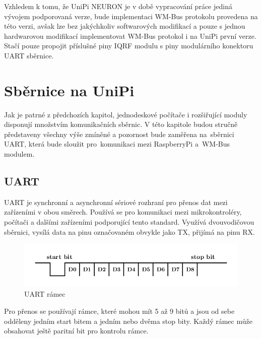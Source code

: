 \vspace{10pt}
Vzhledem k tomu, že UniPi NEURON je v době vypracování práce jediná vývojem podporovaná verze, bude implementaci WM-Bus protokolu provedena na této verzi, avšak lze bez jakýchkoliv softwarových modifikací a pouze s jednou hardwarovou modifikací implementovat WM-Bus protokol i na UniPi první verze. Stačí pouze propojit příslušné piny IQRF modulu s piny modulárního konektoru UART sběrnice.



\section{Sběrnice na UniPi}
Jak je patrné z předchozích kapitol, jednodeskové počítače i rozšiřující moduly disponují množstvím komunikačních sběrnic. V této kapitole budou stručně představeny všechny výše zmíněné a pozornost bude zaměřena na~sběrnici UART, která bude sloužit pro~komunikaci mezi RaspberryPi a~WM-Bus modulem.

\subsection{UART}
UART je synchronní a asynchronní sériové rozhraní pro přenos dat mezi zařízeními v obou směrech. Používá se pro komunikaci mezi mikrokontroléry, počítači a dalšími zařízeními podporující tento standard. Využívá dvouvodičovou sběrnici, vysílá data na pinu označovaném obvykle jako TX, přijímá na pinu RX.

 \begin{figure}[!ht]
	\vspace{-10pt}
  \begin{center}
    \includegraphics[scale=1.0]{obrazky/sbernice_uart}
  \end{center}
	\vspace{-30pt}
  \caption{UART rámec}
	\vspace{-5pt}
\end{figure}
Pro přenos se používají rámce, které mohou mít 5 až 9 bitů a jsou od sebe odděleny jedním start bitem a jedním nebo dvěma stop bity. Každý rámec může obsahovat ještě paritní bit pro kontrolu rámce. 

